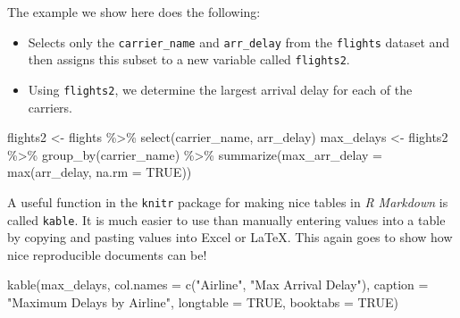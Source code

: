 \documentclass[
  letterpaper,
  12pt,
  twoside]{book}
\newenvironment{Shaded}{\begin{snugshade}}{\end{snugshade}}
\newcommand{\AttributeTok}[1]{\textcolor[rgb]{0.40,0.45,0.13}{#1}}
\newcommand{\ConstantTok}[1]{\textcolor[rgb]{0.56,0.35,0.01}{#1}}
\newcommand{\FunctionTok}[1]{\textcolor[rgb]{0.28,0.35,0.67}{#1}}
\newcommand{\NormalTok}[1]{\textcolor[rgb]{0.00,0.23,0.31}{#1}}
\newcommand{\OtherTok}[1]{\textcolor[rgb]{0.00,0.23,0.31}{#1}}
\newcommand{\SpecialCharTok}[1]{\textcolor[rgb]{0.37,0.37,0.37}{#1}}
\newcommand{\StringTok}[1]{\textcolor[rgb]{0.13,0.47,0.30}{#1}}
\begin{document}
The example we show here does the following:

\begin{itemize}
\item
  Selects only the \texttt{carrier\_name} and \texttt{arr\_delay} from
  the \texttt{flights} dataset and then assigns this subset to a new
  variable called \texttt{flights2}.
\item
  Using \texttt{flights2}, we determine the largest arrival delay for
  each of the carriers.
\end{itemize}

\begin{Shaded}
\begin{Highlighting}[]
\NormalTok{flights2 }\OtherTok{\textless{}{-}}\NormalTok{ flights }\SpecialCharTok{\%\textgreater{}\%}
  \FunctionTok{select}\NormalTok{(carrier\_name, arr\_delay)}
\NormalTok{max\_delays }\OtherTok{\textless{}{-}}\NormalTok{ flights2 }\SpecialCharTok{\%\textgreater{}\%}
  \FunctionTok{group\_by}\NormalTok{(carrier\_name) }\SpecialCharTok{\%\textgreater{}\%}
  \FunctionTok{summarize}\NormalTok{(}\AttributeTok{max\_arr\_delay =} \FunctionTok{max}\NormalTok{(arr\_delay, }\AttributeTok{na.rm =} \ConstantTok{TRUE}\NormalTok{))}
\end{Highlighting}
\end{Shaded}

A useful function in the \texttt{knitr} package for making nice tables
in \emph{R Markdown} is called \texttt{kable}. It is much easier to use
than manually entering values into a table by copying and pasting values
into Excel or LaTeX. This again goes to show how nice reproducible
documents can be!

\begin{Shaded}
\begin{Highlighting}[]
\FunctionTok{kable}\NormalTok{(max\_delays,}
      \AttributeTok{col.names =} \FunctionTok{c}\NormalTok{(}\StringTok{"Airline"}\NormalTok{, }\StringTok{"Max Arrival Delay"}\NormalTok{),}
      \AttributeTok{caption =} \StringTok{"Maximum Delays by Airline"}\NormalTok{,}
      \AttributeTok{longtable =} \ConstantTok{TRUE}\NormalTok{,}
      \AttributeTok{booktabs =} \ConstantTok{TRUE}\NormalTok{)}
\end{Highlighting}
\end{Shaded}
\end{document}
